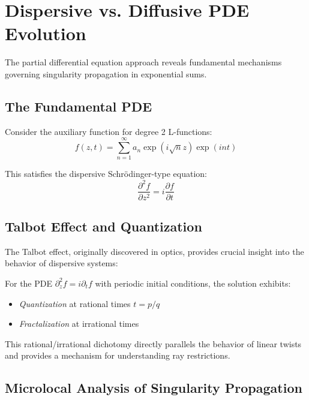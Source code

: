 \section{Dispersive vs. Diffusive PDE Evolution}
\label{sec:pde_evolution}

The partial differential equation approach reveals fundamental mechanisms governing singularity propagation in exponential sums.

\subsection{The Fundamental PDE}

Consider the auxiliary function for degree 2 L-functions:
\begin{equation}
f(z,t) = \sum_{n=1}^{\infty} a_n \exp(i\sqrt{n} z) \exp(int)
\end{equation}

This satisfies the dispersive Schrödinger-type equation:
\begin{equation}
\frac{\partial^2 f}{\partial z^2} = i \frac{\partial f}{\partial t}
\end{equation}

\subsection{Talbot Effect and Quantization}

The Talbot effect, originally discovered in optics, provides crucial insight into the behavior of dispersive systems:

\begin{theorem}
For the PDE $\partial_z^2 f = i \partial_t f$ with periodic initial conditions, the solution exhibits:
\begin{itemize}
\item \emph{Quantization} at rational times $t = p/q$
\item \emph{Fractalization} at irrational times
\end{itemize}
\end{theorem}

This rational/irrational dichotomy directly parallels the behavior of linear twists and provides a mechanism for understanding ray restrictions.

\subsection{Microlocal Analysis of Singularity Propagation}

